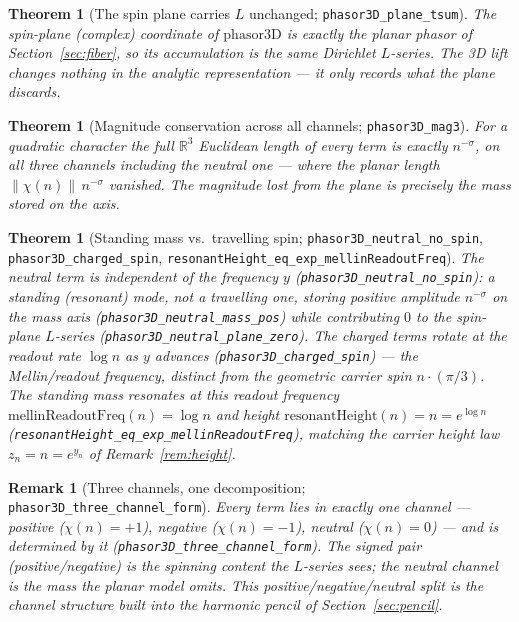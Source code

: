 \documentclass[11pt]{article}
\newtheorem{theorem}[definition]{Theorem}
\newtheorem{remark}[definition]{Remark}
\newcommand{\R}{\mathbb{R}}
\newcommand{\code}[1]{\texttt{#1}}
\begin{document}
\begin{theorem}[The spin plane carries $L$ unchanged; \code{phasor3D\_plane\_tsum}]\label{thm:plane}
The spin-plane (complex) coordinate of $\mathrm{phasor3D}$ is exactly the planar phasor of
Section~\ref{sec:fiber}, so its accumulation is the same Dirichlet $L$-series. The 3D lift changes
nothing in the analytic representation --- it only records what the plane discards.
\end{theorem}

\begin{theorem}[Magnitude conservation across all channels; \code{phasor3D\_mag3}]\label{thm:mag3}
For a quadratic character the full $\R^3$ Euclidean length of every term is exactly $n^{-\sigma}$, on
\emph{all three} channels including the neutral one --- where the planar length $\|\chi(n)\|\,n^{-\sigma}$
vanished. The magnitude lost from the plane is precisely the mass stored on the axis.
\end{theorem}

\begin{theorem}[Standing mass vs.\ travelling spin; \code{phasor3D\_neutral\_no\_spin}, \code{phasor3D\_charged\_spin}, \code{resonantHeight\_eq\_exp\_mellinReadoutFreq}]\label{thm:standing}
The neutral term is independent of the frequency $y$ (\code{phasor3D\_neutral\_no\_spin}): a
\emph{standing} (resonant) mode, not a travelling one, storing positive amplitude $n^{-\sigma}$ on the
mass axis (\code{phasor3D\_neutral\_mass\_pos}) while contributing $0$ to the spin-plane $L$-series
(\code{phasor3D\_neutral\_plane\_zero}). The charged terms rotate at the readout rate $\log n$ as $y$
advances (\code{phasor3D\_charged\_spin}) --- the Mellin/readout frequency, distinct from the geometric
carrier spin $n\cdot(\pi/3)$. The standing mass resonates at this readout frequency
$\mathrm{mellinReadoutFreq}(n)=\log n$ and height $\mathrm{resonantHeight}(n)=n=e^{\log n}$
(\code{resonantHeight\_eq\_exp\_mellinReadoutFreq}), matching the carrier height law $z_n=n=e^{y_n}$ of
Remark~\ref{rem:height}.
\end{theorem}

\begin{remark}[Three channels, one decomposition; \code{phasor3D\_three\_channel\_form}]\label{rem:threechannel}
Every term lies in exactly one channel --- positive ($\chi(n)=+1$), negative ($\chi(n)=-1$), neutral
($\chi(n)=0$) --- and is determined by it (\code{phasor3D\_three\_channel\_form}). The signed pair
(positive/negative) is the spinning content the $L$-series sees; the neutral channel is the mass the
planar model omits. This positive/negative/neutral split is the channel structure built into the
harmonic pencil of Section~\ref{sec:pencil}.
\end{remark}
\end{document}
